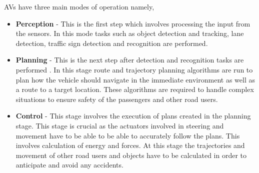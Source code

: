 AVs have three main modes of operation namely,
\begin{itemize}
	\item \textbf{Perception} - This is the first step which involves processing the input from the sensors. In this mode tasks such as object detection and tracking, lane detection, traffic sign detection and recognition are performed.
	\item \textbf{Planning} - This is the next step after detection and recognition tasks are performed . In this stage route and trajectory planning algorithms are run  to plan how the vehicle should navigate in the immediate environment as well as a route to a target location. These algorithms are required to handle complex situations to ensure safety of the passengers and other road users. 
	\item \textbf{Control} - This stage involves the execution of plans created in the planning stage. This stage is crucial as the actuators involved in steering and movement have to be able to be able to accurately follow the plans. This involves calculation of energy and forces. At this stage the trajectories and movement of other road users and objects have to be calculated in order to anticipate and avoid any accidents. 
	
\end{itemize}



